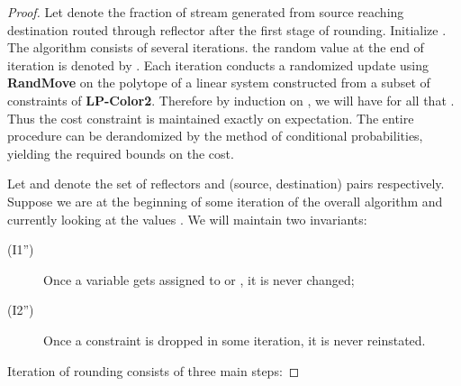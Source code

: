 \begin{proof}
Let  denote the fraction of stream generated from source  reaching destination
 routed through reflector  after the first stage of rounding. Initialize . The algorithm
consists of several iterations. the random value at the end of iteration  is denoted by . Each iteration  conducts a randomized update using {\bf RandMove} on the polytope of a linear system constructed from a subset of constraints of {\bf LP-Color2}. Therefore by induction on , we will have for all  that . Thus the cost constraint is maintained exactly on expectation. The entire procedure can be derandomized by the method of conditional probabilities, yielding the required bounds on the cost.

Let  and  denote the set of reflectors and (source, destination) pairs respectively.
Suppose we are at the beginning of some iteration  of the overall algorithm and currently looking
at the values . We will maintain two invariants:
\begin{description}
\item[(I1'')] Once a variable  gets assigned to  or , it is never changed;
\item[(I2'')] Once a constraint is dropped in some iteration, it is never reinstated.
\end{description}
Iteration  of rounding consists of three main steps:


\end{proof}
